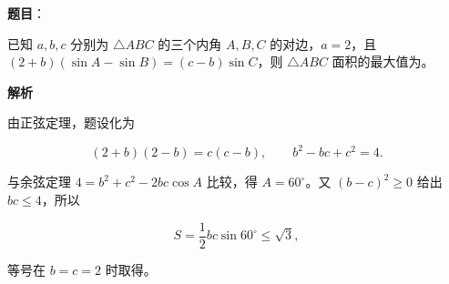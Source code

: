 \begin{answer}

\textbf{题目}：

已知 $a,b,c$ 分别为 $\triangle ABC$ 的三个内角 $A,B,C$ 的对边，$a=2$，且 $(2+b)(\sin A-\sin B)=(c-b)\sin C$，则 $\triangle ABC$ 面积的最大值为\gkblank{}。

\textbf{解析}

由正弦定理，题设化为

\nopagebreak[4]
\[
(2+b)(2-b)=c(c-b),\qquad b^2-bc+c^2=4.
\]

与余弦定理 $4=b^2+c^2-2bc\cos A$ 比较，得 $A=60^\circ$。又 $(b-c)^2\geqslant0$ 给出 $bc\leqslant4$，所以

\nopagebreak[4]
\[
S=\frac12bc\sin60^\circ\leqslant\sqrt3,
\]

等号在 $b=c=2$ 时取得。


\end{answer}

